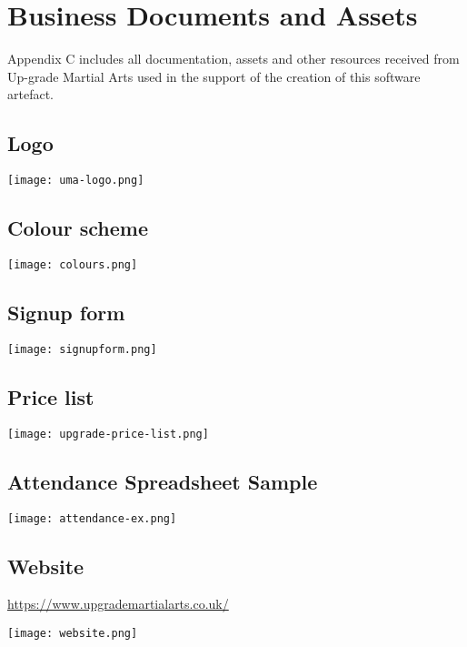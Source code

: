 
\chapter{Business Documents and Assets} %

\label{AppendixC} %

Appendix C includes all documentation, assets and other resources received from Up-grade Martial Arts used in the support of the creation of this software artefact.


\section{Logo}\label{AppendixC:Logo}

\centerline{\texttt{[image: uma-logo.png]}}


\section{Colour scheme}\label{AppendixC:ColourScheme}

\centerline{\texttt{[image: colours.png]}}


\section{Signup form}\label{AppendixC:SignupForm}

\centerline{\texttt{[image: signupform.png]}}


\section{Price list}\label{AppendixC:PriceList}

\centerline{\texttt{[image: upgrade-price-list.png]}}


\section{Attendance Spreadsheet Sample}\label{AppendixC:AttendanceSpreadsheet}

\centerline{\texttt{[image: attendance-ex.png]}}


\section{Website}\label{AppendixC:Website}

\href{https://www.upgrademartialarts.co.uk/}{https://www.upgrademartialarts.co.uk/}

\centerline{\texttt{[image: website.png]}}